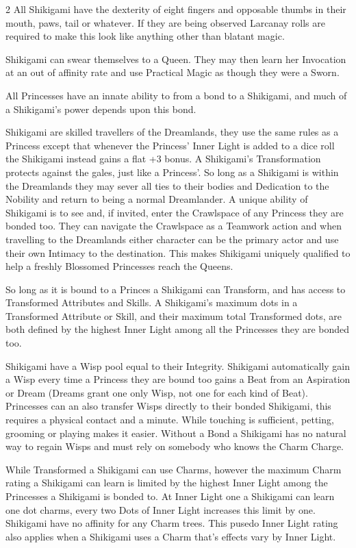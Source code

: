 \begin{multicols}{2}
All Shikigami have the dexterity of eight fingers and opposable thumbs in their mouth, paws, tail or whatever. If they are being observed Larcanay rolls are required to make this look like anything other than blatant magic.

Shikigami can swear themselves to a Queen. They may then learn her Invocation at an out of affinity rate and use Practical Magic as though they were a Sworn.

All Princesses have an innate ability to from a bond to a Shikigami, and much of a Shikigami's power depends upon this bond. 

Shikigami are skilled travellers of the Dreamlands, they use the same rules as a Princess except that whenever the Princess' Inner Light is added to a dice roll the Shikigami instead gains a flat +3 bonus. A Shikigami's Transformation protects against the gales, just like a Princess'. So long as a Shikigami is within the Dreamlands they may sever all ties to their bodies and Dedication to the Nobility and return to being a normal Dreamlander. A unique ability of Shikigami is to see and, if invited, enter the Crawlspace of any Princess they are bonded too. They can navigate the Crawlspace as a Teamwork action and when travelling to the Dreamlands either character can be the primary actor and use their own Intimacy to the destination. This makes Shikigami uniquely qualified to help a freshly Blossomed Princesses reach the Queens.

So long as it is bound to a Princes a Shikigami can Transform, and has access to Transformed Attributes and Skills. A Shikigami's maximum dots in a Transformed Attribute or Skill, and their maximum total Transformed dots, are both defined by the highest Inner Light among all the Princesses they are bonded too.

Shikigami have a Wisp pool equal to their Integrity. Shikigami automatically gain a Wisp every time a Princess they are bound too gains a Beat from an Aspiration or Dream (Dreams grant one only Wisp, not one for each kind of Beat). Princesses can an also transfer Wisps directly to their bonded Shikigami, this requires a physical contact and a minute. While touching is sufficient, petting, grooming or playing makes it easier. Without a Bond a Shikigami has no natural way to regain Wisps and must rely on somebody who knows the Charm Charge. 

While Transformed a Shikigami can use Charms, however the maximum Charm rating a Shikigami can learn is limited by the highest Inner Light among the Princesses a Shikigami is bonded to. At Inner Light one a Shikigami can learn one dot charms, every two Dots of Inner Light increases this limit by one. Shikigami have no affinity for any Charm trees. This pusedo Inner Light rating also applies when a Shikigami uses a Charm that's effects vary by Inner Light.


\end{multicols}
